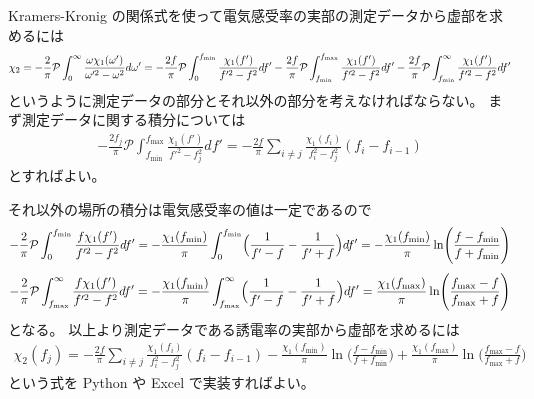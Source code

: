 \documentclass[9pt,dvipdfmx,a4paper]{jsarticle}
\begin{document}
Kramers-Kronig の関係式を使って電気感受率の実部の測定データから虚部を求めるには
\begin{align}
    \chi_2
    = -\frac{2}{\pi}\mathcal{P}\int_{0}^{\infty} \frac{\omega \chi_1(\omega')}{\omega'^2-\omega^2} d\omega'\notag
    = -\frac{2f}{\pi}\mathcal{P}\int_{0}^{f_{\mathrm{min}}} \frac{\chi_1(f')}{f'^2-f^2} df'
       -\frac{2f}{\pi}\mathcal{P}\int_{f_\mathrm{min}}^{f_{\mathrm{max}}} \frac{\chi_1(f')}{f'^2-f^2} df'
       -\frac{2f}{\pi}\mathcal{P}\int_{f_\mathrm{min}}^{\infty} \frac{\chi_1(f')}{f'^2-f^2} df'
\end{align}
というように測定データの部分とそれ以外の部分を考えなければならない。
まず測定データに関する積分については
\begin{align}
-\frac{2f_j}{\pi}\mathcal{P}\int_{f_\mathrm{min}}^{f_{\mathrm{max}}} \frac{\chi_1(f')}{f'^2-f_j^2} df'
= -\frac{2f}{\pi}\sum_{i\neq j} \frac{\chi_1(f_i)}{f_i^2-f_j^2}(f_i-f_{i-1})
\end{align}
とすればよい。

それ以外の場所の積分は電気感受率の値は一定であるので
\begin{align}
    -\frac{2}{\pi}\mathcal{P}\int_{0}^{f_{\mathrm{min}}} \frac{f \chi_1(f')}{f'^2-f^2} df'
    = -\frac{\chi_1(f_{\mathrm{min}})}{\pi}\int_{0}^{f_{\mathrm{min}}} \Bigl(\frac{1}{f'-f}-\frac{1}{f'+f}\Bigl) df'
    = -\frac{\chi_1(f_{\mathrm{min}})}{\pi}\ln\Biggl(\frac{f-f_{\mathrm{min}}}{f+f_{\mathrm{min}}} \Biggr)
\end{align}
\begin{align}
    -\frac{2}{\pi}\mathcal{P}\int_{f_{\mathrm{max}}}^{\infty} \frac{f \chi_1(f')}{f'^2-f^2} df'
    = -\frac{\chi_1(f_{\mathrm{min}})}{\pi}\int_{f_{\mathrm{max}}}^{\infty} \Bigl(\frac{1}{f'-f}-\frac{1}{f'+f}\Bigl) df'
    =  \frac{\chi_1(f_{\mathrm{max}})}{\pi}\ln\Biggl(\frac{f_{\mathrm{max}}-f}{f_{\mathrm{max}}+f} \Biggr)
\end{align}
となる。
以上より測定データである誘電率の実部から虚部を求めるには
\begin{align}
    \chi_2(f_j) =
    - \frac{2f}{\pi}\sum_{i\neq j} \frac{\chi_1(f_i)}{f_i^2-f_j^2}(f_i-f_{i-1})
    - \frac{\chi_1(f_{\mathrm{min}})}{\pi}\ln\Biggl(\frac{f-f_{\mathrm{min}}}{f+f_{\mathrm{min}}} \Biggr)
    + \frac{\chi_1(f_{\mathrm{max}})}{\pi}\ln\Biggl(\frac{f_{\mathrm{max}}-f}{f_{\mathrm{max}}+f} \Biggr)
\end{align}
という式を Python や Excel で実装すればよい。
\end{document}

